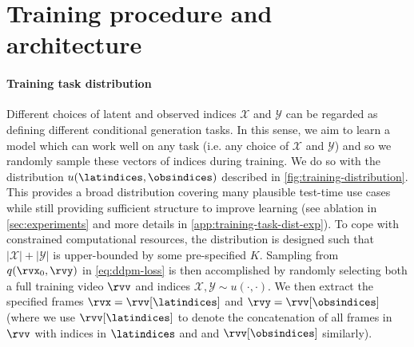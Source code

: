 \section{Training procedure and architecture}\label{sec:method}


\paragraph{Training task distribution}
Different choices of latent and observed indices $\mathcal{X}$ and $\mathcal{Y}$ can be regarded as defining different conditional generation tasks. In this sense, we aim to learn a model which can work well on any task (i.e. any choice of $\mathcal{X}$ and $\mathcal{Y}$) and so we randomly sample these vectors of indices during training. We do so with the distribution $u(\latindices,\obsindices)$ described in \cref{fig:training-distribution}. This provides a broad distribution covering many plausible test-time use cases while still providing sufficient structure to improve learning (see ablation in \cref{sec:experiments} and more details in \cref{app:training-task-dist-exp}). To cope with constrained computational resources, the distribution is designed such that $|\mathcal{X}|+|\mathcal{Y}|$ is upper-bounded by some pre-specified $K$. Sampling from $q(\rvx_0, \rvy)$ in \cref{eq:ddpm-loss} is then accomplished by randomly selecting both a full training video $\rvv$ and indices $\mathcal{X},\mathcal{Y}\sim u(\cdot,\cdot)$. We then extract the specified frames $\rvx = \rvv[\latindices]$ and $\rvy = \rvv[\obsindices]$ (where we use $\rvv[\latindices]$ to denote the concatenation of all frames in $\rvv$ with indices in $\latindices$ and and $\rvv[\obsindices]$ similarly).




